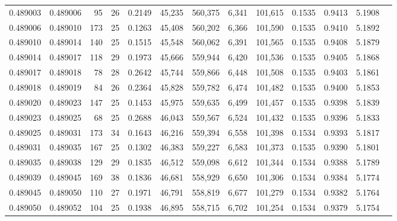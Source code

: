 \begin{tabular}{rrrrrrrrrrrrr}
0.489003 & 0.489006 &  95 &  26 &                                     0.2149 &  45,235 & 560,375 &   6,341 & 101,615 & 0.1535 & 0.9413 & 5.1908 \\
0.489006 & 0.489010 & 173 &  25 &                                     0.1263 &  45,408 & 560,202 &   6,366 & 101,590 & 0.1535 & 0.9410 & 5.1892 \\
0.489010 & 0.489014 & 140 &  25 &                                     0.1515 &  45,548 & 560,062 &   6,391 & 101,565 & 0.1535 & 0.9408 & 5.1879 \\
0.489014 & 0.489017 & 118 &  29 &                                     0.1973 &  45,666 & 559,944 &   6,420 & 101,536 & 0.1535 & 0.9405 & 5.1868 \\
0.489017 & 0.489018 &  78 &  28 &                                     0.2642 &  45,744 & 559,866 &   6,448 & 101,508 & 0.1535 & 0.9403 & 5.1861 \\
0.489018 & 0.489019 &  84 &  26 &                                     0.2364 &  45,828 & 559,782 &   6,474 & 101,482 & 0.1535 & 0.9400 & 5.1853 \\
0.489020 & 0.489023 & 147 &  25 &                                     0.1453 &  45,975 & 559,635 &   6,499 & 101,457 & 0.1535 & 0.9398 & 5.1839 \\
0.489023 & 0.489025 &  68 &  25 &                                     0.2688 &  46,043 & 559,567 &   6,524 & 101,432 & 0.1535 & 0.9396 & 5.1833 \\
0.489025 & 0.489031 & 173 &  34 &                                     0.1643 &  46,216 & 559,394 &   6,558 & 101,398 & 0.1534 & 0.9393 & 5.1817 \\
0.489031 & 0.489035 & 167 &  25 &                                     0.1302 &  46,383 & 559,227 &   6,583 & 101,373 & 0.1535 & 0.9390 & 5.1801 \\
0.489035 & 0.489038 & 129 &  29 &                                     0.1835 &  46,512 & 559,098 &   6,612 & 101,344 & 0.1534 & 0.9388 & 5.1789 \\
0.489039 & 0.489045 & 169 &  38 &                                     0.1836 &  46,681 & 558,929 &   6,650 & 101,306 & 0.1534 & 0.9384 & 5.1774 \\
0.489045 & 0.489050 & 110 &  27 &                                     0.1971 &  46,791 & 558,819 &   6,677 & 101,279 & 0.1534 & 0.9382 & 5.1764 \\
0.489050 & 0.489052 & 104 &  25 &                                     0.1938 &  46,895 & 558,715 &   6,702 & 101,254 & 0.1534 & 0.9379 & 5.1754 \\

\end{tabular}
